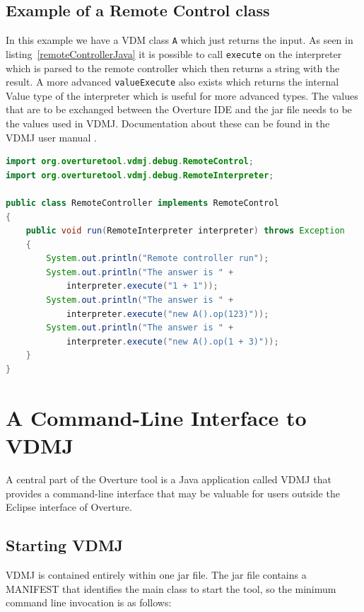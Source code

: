 \documentclass{overturerep}
\begin{document}
{\subsection{Example of a Remote Control class}

In this example we have a VDM class \texttt{A} which just returns the input. As
seen in listing~\ref{remoteControllerJava} it is possible to call
\texttt{execute} on the interpreter which is parsed to the remote
controller which then returns a string with the result. A more
advanced \texttt{valueExecute} also exists which returns the internal
Value type of the interpreter which is useful for more advanced
types. The
values that are to be exchanged between the Overture IDE and the jar
file needs to be the values used in VDMJ. Documentation about these
can be found in the VDMJ user manual \cite{Battle09}.

\begin{lstlisting}[language=JAVA,label=remoteControllerJava,caption=Remote Controller Java class,captionpos=b]
import org.overturetool.vdmj.debug.RemoteControl;
import org.overturetool.vdmj.debug.RemoteInterpreter;

public class RemoteController implements RemoteControl
{
	public void run(RemoteInterpreter interpreter) throws Exception
	{
		System.out.println("Remote controller run");
		System.out.println("The answer is " + 
			interpreter.execute("1 + 1")); 
		System.out.println("The answer is " + 
			interpreter.execute("new A().op(123)")); 
		System.out.println("The answer is " + 
			interpreter.execute("new A().op(1 + 3)")); 
	}
}
\end{lstlisting}

\section{A Command-Line Interface to VDMJ}\label{sec:commandline}

A central part of the Overture tool is a Java application
called VDMJ that provides a command-line interface that may be valuable
for users outside the Eclipse interface of Overture.

\subsection{Starting VDMJ}

VDMJ is contained entirely within one jar file. The jar
file contains a MANIFEST that identifies the main class to start the
tool, so the minimum command line invocation is as follows:

}
\end{document}
